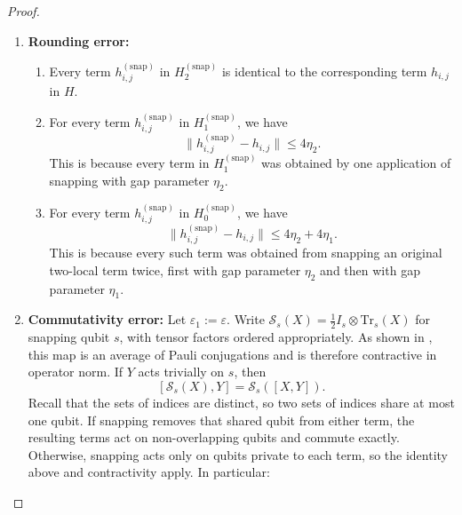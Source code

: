 \documentclass[a4paper,onecolumn,11pt]{quantumarticle}
\theoremstyle{plain}
\newcommand{\eps}{\varepsilon}
\newcommand{\snp}{{(\mathrm{snap})}}
\begin{document}
\begin{proof}
\begin{enumerate}
\begin{enumerate}
    \begin{enumerate}
        \item Every term $h_{i,j}^\snp$ in $H^\snp_2$ is $\eta_2$-gapped on both subsystems $i$ and $j$ according to .
        \item Every term $h_{i,j}^\snp$ in $H^\snp_1$ is $\eta_1$-gapped (according to ) on the subsystem acted upon nontrivially.
        \item Every term $h_{i,j}^\snp$ in $H^\snp_0$ is proportional to the identity (zero spectral gap).
    \end{enumerate}
    \item \textbf{Rounding error:}
    \begin{enumerate}
        \item Every term $h^\snp_{i,j}$ in $H^\snp_2$ is identical to the corresponding term $h_{i,j}$ in $H$.
        \item For every term $h^\snp_{i,j}$ in $H^\snp_1$, we have
        \begin{equation}\label{eqn:distance-snapped-once}
            \| h^\snp_{i,j} - h_{i,j} \| \leq 4\eta_2.
        \end{equation}
        This is because every term in $H^\snp_1$ was obtained by one application of snapping with gap parameter $\eta_2$.
        \item For every term $h^\snp_{i,j}$ in $H^\snp_0$, we have
        \[ \|h^\snp_{i,j} - h_{i,j}\| \leq 4\eta_2 + 4\eta_1. \]
        This is because every such term was obtained from snapping an original two-local term twice, first with gap parameter $\eta_2$ and then with gap parameter $\eta_1$.
    \end{enumerate}
        \item \textbf{Commutativity error:} Let $\eps_1 := \eps$.
    Write $\mathcal{S}_s(X)=\frac12 I_s\otimes\mathrm{Tr}_s(X)$ for snapping qubit $s$, with tensor factors ordered appropriately. As shown in , this map is an average of Pauli conjugations and is therefore contractive in operator norm. If $Y$ acts trivially on $s$, then
    \[
        [\mathcal{S}_s(X),Y]=\mathcal{S}_s([X,Y]).
    \]
    Recall that the sets of indices are distinct, so two sets of indices share at most one qubit. If snapping removes that shared qubit from either term, the resulting terms act on non-overlapping qubits and commute exactly. Otherwise, snapping acts only on qubits private to each term, so the identity above and contractivity apply. In particular:

\end{enumerate}
\end{enumerate}
\end{proof}
\end{document}
